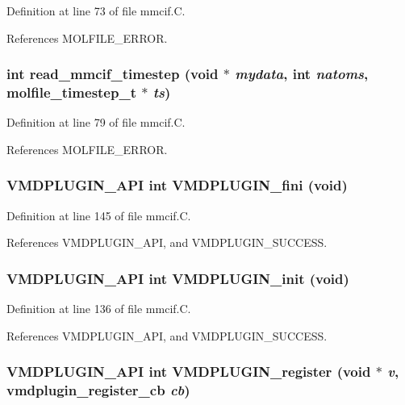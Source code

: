 Definition at line 73 of file mmcif.C.

References MOLFILE\_\-ERROR.
\subsubsection{\setlength{\rightskip}{0pt plus 5cm}int read\_\-mmcif\_\-timestep (void $\ast$ {\em mydata}, int {\em natoms}, {\bf molfile\_\-timestep\_\-t} $\ast$ {\em ts})\hspace{0.3cm}{\tt  [static]}}\label{mmcif_8C_a3}




Definition at line 79 of file mmcif.C.

References MOLFILE\_\-ERROR.
\subsubsection{\setlength{\rightskip}{0pt plus 5cm}VMDPLUGIN\_\-API int VMDPLUGIN\_\-fini (void)}\label{mmcif_8C_a8}




Definition at line 145 of file mmcif.C.

References VMDPLUGIN\_\-API, and VMDPLUGIN\_\-SUCCESS.
\subsubsection{\setlength{\rightskip}{0pt plus 5cm}VMDPLUGIN\_\-API int VMDPLUGIN\_\-init (void)}\label{mmcif_8C_a6}




Definition at line 136 of file mmcif.C.

References VMDPLUGIN\_\-API, and VMDPLUGIN\_\-SUCCESS.
\subsubsection{\setlength{\rightskip}{0pt plus 5cm}VMDPLUGIN\_\-API int VMDPLUGIN\_\-register (void $\ast$ {\em v}, {\bf vmdplugin\_\-register\_\-cb} {\em cb})}\label{mmcif_8C_a7}




